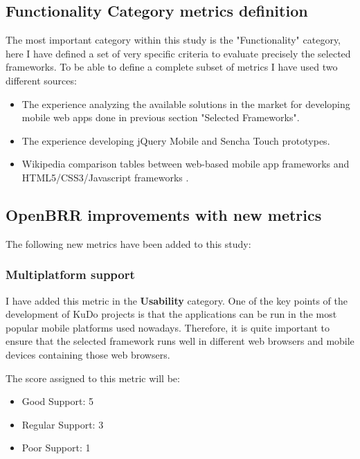 \documentclass[a4paper,12pt]{book}
\begin{document}
\subsection{Functionality Category metrics definition}
\label{Functionality Category metrics definition}

The most important category within this study is the "Functionality" category, here I have defined a set of very specific criteria to evaluate precisely the selected frameworks. To be able to define a complete subset of metrics I have used two different sources:

\begin{itemize}
 \item The experience analyzing the available solutions in the market for developing mobile web apps done in previous section "Selected Frameworks".
  \item The experience developing jQuery Mobile and Sencha Touch prototypes.
 \item Wikipedia comparison tables between web-based mobile app frameworks \cite{wikipedia1}  and HTML5/CSS3/Javascript frameworks \cite{wikipedia2}.
\end{itemize}

\subsection{OpenBRR improvements with new metrics}
\label{OpenBRR improvements with new metrics}

The following new metrics have been added to this study:

\subsubsection{Multiplatform support}
\label{Multiplatform support}

I have added this metric in the \textbf{Usability} category. One of the key points of the development of KuDo projects is that the applications can be run in the most popular mobile platforms used nowadays. Therefore, it is quite important to ensure that the selected framework runs well in different web browsers and mobile devices containing those web browsers.

The score assigned to this metric will be:
\begin{itemize}
 \item Good Support: 5
 \item Regular Support: 3
 \item Poor Support: 1
\end{itemize}
\end{document}
